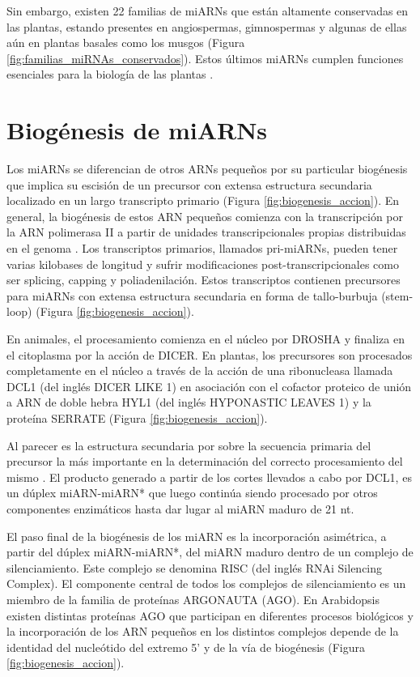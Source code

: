 Sin embargo, existen 22 familias de miARNs que están altamente conservadas en las plantas, estando presentes en angiospermas, gimnospermas y algunas de ellas aún en plantas basales como los musgos \citep{Axtell2008,Arazi2005,pmid16623887} (Figura \ref{fig:familias_miRNAs_conservados}).
Estos últimos miARNs cumplen funciones esenciales para la biología de las plantas \citep{Jones-Rhoades2006}.


\section{Biogénesis de miARNs}

Los miARNs se diferencian de otros ARNs pequeños por su particular biogénesis que implica su escisión de un precursor con extensa estructura secundaria localizado en un largo transcripto primario (Figura \ref{fig:biogenesis_accion}).
En general, la biogénesis de estos ARN pequeños comienza con la transcripción por la ARN polimerasa II \citep{Xie2005a} a partir de unidades transcripcionales propias distribuidas en el genoma \citep{Reinhart2002}.
Los transcriptos primarios, llamados pri-miARNs, pueden tener varias kilobases de longitud y sufrir modificaciones post-transcripcionales como ser splicing, capping y poliadenilación. 
Estos transcriptos contienen precursores para miARNs con extensa estructura secundaria en forma de tallo-burbuja (stem-loop) \citep{Jones-Rhoades2006} (Figura \ref{fig:biogenesis_accion}).

En animales, el procesamiento comienza en el núcleo por DROSHA y finaliza en el citoplasma por la acción de DICER.
En plantas, los precursores son procesados completamente en el núcleo a través de la acción de una ribonucleasa llamada DCL1 \citep{Reinhart2002,pmid12417148} (del inglés DICER LIKE 1) en asociación con el cofactor proteico de unión a ARN de doble hebra HYL1 \citep{Han2004} (del inglés HYPONASTIC LEAVES 1) y la proteína SERRATE \citep{Lobbes2006} (Figura \ref{fig:biogenesis_accion}).

Al parecer es la estructura secundaria por sobre la secuencia primaria del precursor la más importante en la determinación del correcto procesamiento del mismo \citep{Bologna11112012} .
El producto generado a partir de los cortes llevados a cabo por DCL1, es un dúplex miARN-miARN* que luego continúa siendo procesado por otros componentes enzimáticos hasta dar lugar al miARN maduro de 21 nt.

El paso final de la biogénesis de los miARN es la incorporación asimétrica, a partir del dúplex miARN-miARN*, del miARN maduro dentro de un complejo de silenciamiento.
Este complejo se denomina RISC (del inglés RNAi Silencing Complex).
El componente central de todos los complejos de silenciamiento es un miembro de la familia de proteínas ARGONAUTA (AGO).
En Arabidopsis existen distintas proteínas AGO que participan en diferentes procesos biológicos \citep{Cellulaire2008} y la incorporación de los ARN pequeños en los distintos complejos depende de la identidad del nucleótido del extremo 5' y de la vía de biogénesis \citep{pmid18342361,Montgomery2008,Takeda2008} (Figura \ref{fig:biogenesis_accion}). 

